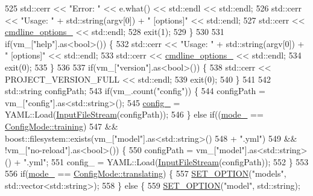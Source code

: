 \begin{DoxyCode}
525     std::cerr << \textcolor{stringliteral}{"Error: "} << e.what() << std::endl << std::endl;
526     std::cerr << \textcolor{stringliteral}{"Usage: "} + std::string(argv[0]) + \textcolor{stringliteral}{" [options]"} << std::endl;
527     std::cerr << \hyperlink{classmarian_1_1ConfigParser_af57fa6f4fb82e1e5b6068e7dcb56b3b2}{cmdline\_options\_} << std::endl;
528     exit(1);
529   \}
530 
531   \textcolor{keywordflow}{if}(vm\_[\textcolor{stringliteral}{"help"}].as<bool>()) \{
532     std::cerr << \textcolor{stringliteral}{"Usage: "} + std::string(argv[0]) + \textcolor{stringliteral}{" [options]"} << std::endl;
533     std::cerr << \hyperlink{classmarian_1_1ConfigParser_af57fa6f4fb82e1e5b6068e7dcb56b3b2}{cmdline\_options\_} << std::endl;
534     exit(0);
535   \}
536 
537   \textcolor{keywordflow}{if}(vm\_[\textcolor{stringliteral}{"version"}].as<bool>()) \{
538     std::cerr << PROJECT\_VERSION\_FULL << std::endl;
539     exit(0);
540   \}
541 
542   std::string configPath;
543   \textcolor{keywordflow}{if}(vm\_.count(\textcolor{stringliteral}{"config"})) \{
544     configPath = vm\_[\textcolor{stringliteral}{"config"}].as<std::string>();
545     \hyperlink{classmarian_1_1ConfigParser_a48aeae345c018ede7fb97d4705d5aeb1}{config\_} = YAML::Load(\hyperlink{classInputFileStream}{InputFileStream}(configPath));
546   \} \textcolor{keywordflow}{else} \textcolor{keywordflow}{if}((\hyperlink{classmarian_1_1ConfigParser_ae3bb2ffc2601222cc53734a60ab1f980}{mode\_} == \hyperlink{namespacemarian_aaddd4b008ff5352b1fe7e16574f7e1f9ac185ddac8b5a8f5aa23c5b80bc12d214}{ConfigMode::training})
547             && boost::filesystem::exists(vm\_[\textcolor{stringliteral}{"model"}].as<std::string>()
548                                          + \textcolor{stringliteral}{".yml"})
549             && !vm\_[\textcolor{stringliteral}{"no-reload"}].as<bool>()) \{
550     configPath = vm\_[\textcolor{stringliteral}{"model"}].as<std::string>() + \textcolor{stringliteral}{".yml"};
551     config\_ = YAML::Load(\hyperlink{classInputFileStream}{InputFileStream}(configPath));
552   \}
553 
556   \textcolor{keywordflow}{if}(\hyperlink{classmarian_1_1ConfigParser_ae3bb2ffc2601222cc53734a60ab1f980}{mode\_} == \hyperlink{namespacemarian_aaddd4b008ff5352b1fe7e16574f7e1f9a5143d2bebfe7a6b9c7050a8f6bf53e2b}{ConfigMode::translating}) \{
557     \hyperlink{config__parser_8cpp_affc23be689aba6d401f64257177c293c}{SET\_OPTION}(\textcolor{stringliteral}{"models"}, std::vector<std::string>);
558   \} \textcolor{keywordflow}{else} \{
559     \hyperlink{config__parser_8cpp_affc23be689aba6d401f64257177c293c}{SET\_OPTION}(\textcolor{stringliteral}{"model"}, std::string);

\end{DoxyCode}
